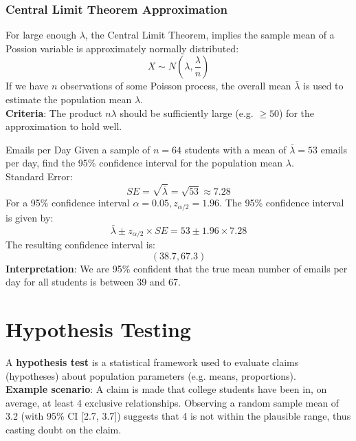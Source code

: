 \documentclass[10pt]{extarticle}
\begin{document}
\subsubsection{Central Limit Theorem Approximation}
For large enough $\lambda$, the Central Limit Theorem, implies the sample mean of a Possion variable is approximately normally distributed:
$$X \sim N(\lambda, \frac{\lambda}{n})$$
If we have $n$ observations of some Poisson process, the overall mean $\bar{\lambda}$ is used to estimate the population mean $\lambda$. \\[2ex]
\textbf{Criteria}: The product $n\lambda$ should be sufficiently large (e.g. $\geq 50$) for the approximation to hold well.
\begin{examplebox}{Emails per Day}{}
    Given a sample of $n=64$ students with a mean of $\bar{\lambda} = 53$ emails per day, find the 95\% confidence interval for the population mean $\lambda$.\\[2ex]

    Standard Error: 
    $$SE = \sqrt{\bar{\lambda}} = \sqrt{53} \approx 7.28$$
    For a 95\% confidence interval $\alpha = 0.05, z_{\alpha/2} = 1.96$.
    The 95\% confidence interval is given by:
    $$\bar{\lambda} \pm z_{\alpha/2} \times SE = 53 \pm 1.96 \times 7.28$$
    The resulting confidence interval is:
    $$(38.7, 67.3)$$
    \textbf{Interpretation}: We are 95\% confident that the true mean number of emails per day for all students is between 39 and 67.
    
\end{examplebox}

\pagebreak
\section{Hypothesis Testing}
A \textbf{hypothesis test} is a statistical framework used to evaluate claims (hypotheses) about population parameters (e.g. means, proportions). \\[2ex]
\textbf{Example scenario}: A claim is made that college students have been in, on average, at least 4 exclusive relationships. Observing a random sample mean of 3.2 (with 95\% CI [2.7, 3.7]) suggests that 4 is not within the plausible range, thus casting doubt on the claim.
\end{document}
